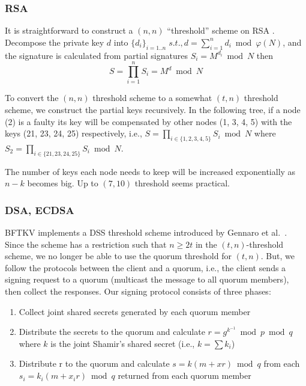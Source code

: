 \subsubsection*{RSA}
It is straightforward to construct a $(n, n)$ ``threshold'' scheme on
RSA \cite{garay,rabin}. Decompose the private key $d$ into $\{d_i\}_{i =
1..n} \; s.t., d = \sum_{i=1}^{n} d_i \bmod \varphi(N)$, and the
signature is calculated from partial signatures $S_i = M^{d_i} \bmod
N$ then
\[
  S = \prod_{i=1}^{n} S_i = M^d \bmod N
\]

To convert the $(n, n)$ threshold scheme to a somewhat $(t, n)$
threshold scheme, we construct the partial keys recursively. In the
following tree, if a node (2) is a faulty its key will be compensated
by other nodes (1, 3, 4, 5) with the keys (21, 23, 24, 25)
respectively, i.e., $S = \prod_{i \in \{1,2,3,4,5\}} S_i \bmod N$
where $S_2 = \prod_{i \in \{21,23,24,25\}} S_i \bmod N$.


The number of keys each node needs to keep will be increased
exponentially as $n - k$ becomes big. Up to $(7,10)$ threshold seems
practical.

\subsubsection*{DSA, ECDSA}
BFTKV implements a DSS threshold scheme introduced by Gennaro et
al.\ \cite{Gennaro}.
Since the scheme has a restriction such that $n \geq 2t$ in the $(t,
n)$-threshold scheme, we no longer be able to use the quorum threshold
for $(t, n)$. But, we follow the protocols between the client and a
quorum, i.e., the client sends a signing request to a quorum
(multicast the message to all quorum members), then collect the
responses. Our signing protocol consists of three phases:
\begin{enumerate}
\item Collect joint shared secrets generated by each quorum member
\item Distribute the secrets to the quorum and calculate
  $r=g^{k^{-1}} \bmod p \bmod q$ where $k$ is the
  joint Shamir's shared secret (i.e., $k = \sum k_i$)
\item Distribute r to the quorum and calculate $s=k(m+xr) \bmod q$
  from each $s_i=k_i(m+x_ir) \bmod q$ returned from each quorum member
\end{enumerate}
